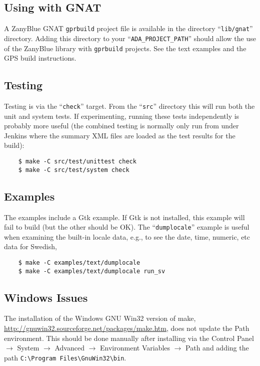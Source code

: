 \subsection{Using with GNAT}

A ZanyBlue GNAT \texttt{gprbuild} project file is available in the
directory ``\texttt{lib/gnat}'' directory.  Adding this directory to
your ``\verb|ADA_PROJECT_PATH|'' should allow the use of the ZanyBlue
library with \texttt{gprbuild} projects.  See the text examples and
the GPS build instructions.

\subsection{Testing}

Testing is via the ``\texttt{check}'' target.  From the ``\texttt{src}''
directory this will run both the unit and system tests.  If experimenting,
running these tests independently is probably more useful (the combined
testing is normally only run from under Jenkins where the summary XML files
are loaded as the test results for the build):
\begin{small}
\begin{verbatim}
    $ make -C src/test/unittest check
    $ make -C src/test/system check
\end{verbatim}
\end{small}

\subsection{Examples}

The examples include a Gtk example.  If Gtk is not installed, this example
will fail to build (but the other should be OK).  The ``\texttt{dumplocale}''
example is useful when examining the built-in locale data, e.g., to see
the date, time, numeric, etc data for Swedish,
\begin{small}
\begin{verbatim}
    $ make -C examples/text/dumplocale
    $ make -C examples/text/dumplocale run_sv
\end{verbatim}
\end{small}

\subsection{Windows Issues}

The installation of the Windows GNU Win32 version of make,
\url{http://gnuwin32.sourceforge.net/packages/make.htm}, does not update
the Path environment. This should be done manually after installing
via the Control Panel $\rightarrow$ System $\rightarrow$ Advanced
$\rightarrow$ Environment Variables $\rightarrow$ Path and adding the
path \verb|C:\Program Files\GnuWin32\bin|.

